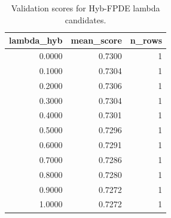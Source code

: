 \begin{table}[t]
\caption{Validation scores for Hyb-FPDE lambda candidates.}
\label{tab:lambda_distribution_computed}
\centering
\begin{tabular}{rrr}
\toprule
lambda\_hyb & mean\_score & n\_rows \\
\midrule
0.0000 & 0.7300 & 1 \\
0.1000 & 0.7304 & 1 \\
0.2000 & 0.7306 & 1 \\
0.3000 & 0.7304 & 1 \\
0.4000 & 0.7301 & 1 \\
0.5000 & 0.7296 & 1 \\
0.6000 & 0.7291 & 1 \\
0.7000 & 0.7286 & 1 \\
0.8000 & 0.7280 & 1 \\
0.9000 & 0.7272 & 1 \\
1.0000 & 0.7272 & 1 \\
\bottomrule
\end{tabular}

\end{table}
